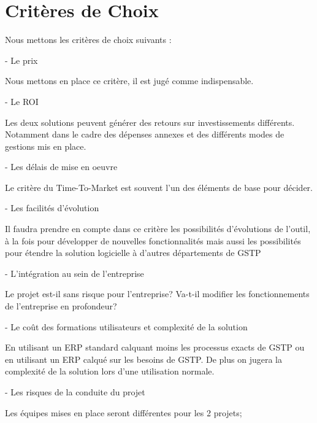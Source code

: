 \section{Critères de Choix}

Nous mettons les critères de choix suivants : 

- Le prix

	Nous mettons en place ce critère, il est jugé comme indispensable.


- Le ROI

	Les deux solutions peuvent générer des retours sur investissements différents.
Notamment dans le cadre des dépenses annexes et des différents modes de gestions mis
en place.

- Les délais de mise en oeuvre

	Le critère du Time-To-Market est souvent l'un des éléments de base pour 
décider.

- Les facilités d'évolution

	Il faudra prendre en compte dans ce critère les possibilités d'évolutions 
de l'outil, à la fois pour développer de nouvelles fonctionnalités mais aussi 
les possibilités pour étendre la solution logicielle à d'autres départements de
GSTP

- L'intégration au sein de l'entreprise

	Le projet est-il sans risque pour l'entreprise? Va-t-il modifier les fonctionnements 
de l'entreprise en profondeur?	

- Le coût des formations utilisateurs et complexité de la solution

	En utilisant un ERP standard calquant moins les processus exacts de GSTP ou 
en utilisant un ERP calqué sur les besoins de GSTP. De plus on jugera la complexité
de la solution lors d'une utilisation normale.


- Les risques de la conduite du projet

	Les équipes mises en place seront différentes pour les 2 projets;



	
